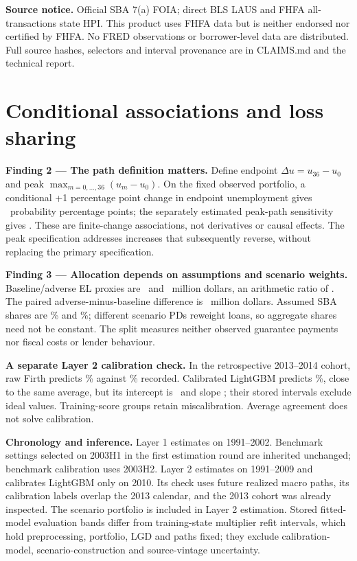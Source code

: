 \textbf{Source notice.} Official SBA 7(a) FOIA; direct BLS LAUS and FHFA all-transactions state HPI. This product uses FHFA data but is neither endorsed nor certified by FHFA. No FRED observations or borrower-level data are distributed. Full source hashes, selectors and interval provenance are in CLAIMS.md and the technical report.
\newpage
\section*{Conditional associations and loss sharing}
\textbf{Finding 2 — The path definition matters.} Define endpoint $\Delta u=u_{36}-u_0$ and peak $\max_{m=0,\ldots,36}(u_m-u_0)$. On the fixed observed portfolio, a conditional +1 percentage point change in endpoint unemployment gives \Endpoint\ probability percentage points; the separately estimated peak-path sensitivity gives \Peak. These are finite-change associations, not derivatives or causal effects. The peak specification addresses increases that subsequently reverse, without replacing the primary specification.

\textbf{Finding 3 — Allocation depends on assumptions and scenario weights.} Baseline/adverse EL proxies are \ElBase\ and \ElAdverse\ million dollars, an arithmetic ratio of \ElRatio. The paired adverse-minus-baseline difference is \ElDiff\ million dollars. Assumed SBA shares are \ShareBase\% and \ShareAdverse\%; different scenario PDs reweight loans, so aggregate shares need not be constant. The split measures neither observed guarantee payments nor fiscal costs or lender behaviour.

\textbf{A separate Layer 2 calibration check.} In the retrospective 2013--2014 cohort, raw Firth predicts \LtwoFirth\% against \LtwoRate\% recorded. Calibrated LightGBM predicts \LtwoTree\%, close to the same average, but its intercept is \TreeIntercept\ and slope \TreeSlope; their stored intervals exclude ideal values. Training-score groups retain miscalibration. Average agreement does not solve calibration.

\textbf{Chronology and inference.} Layer 1 estimates on 1991--2002. Benchmark settings selected on 2003H1 in the first estimation round are inherited unchanged; benchmark calibration uses 2003H2. Layer 2 estimates on 1991--2009 and calibrates LightGBM only on 2010. Its check uses future realized macro paths, its calibration labels overlap the 2013 calendar, and the 2013 cohort was already inspected. The scenario portfolio is included in Layer 2 estimation. Stored fitted-model evaluation bands differ from training-state multiplier refit intervals, which hold preprocessing, portfolio, LGD and paths fixed; they exclude calibration-model, scenario-construction and source-vintage uncertainty.

